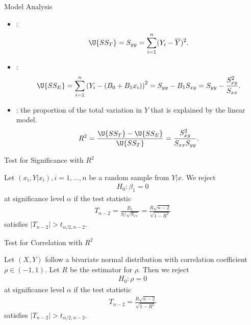 \begin{frame}{Model Analysis}

\begin{itemize}
	\justifying
	\item {}:
	\begin{align*}
	\U{SS_T} = S_{yy} = \sum_{i=1}^n (Y_i-\overline{Y})^2.
	\end{align*}
	\item {}:
	\begin{align*}
	\U{SS_E} = \sum_{i=1}^n \left(Y_i-(B_0+B_1x_i)\right)^2 = S_{yy} - B_1 S_{xy} = S_{yy} - \frac{S_{xy}^2}{S_{xx}}.
	\end{align*}
	\item {}: the proportion of the total variation in $Y$ that is explained by the linear model.
	\begin{align*}
	R^2 = \frac{\U{SS_T} - \U{SS_E}}{\U{SS_T}} = \frac{S_{xy}^2}{S_{xx}S_{yy}}.
	\end{align*}
\end{itemize}

\end{frame}


\begin{frame}{Test for Significance with $R^2$}

\justifying
{} Let $(x_i, Y|x_i), i = 1, \ldots, n$ be a random sample from $Y|x$. We reject
\begin{align*}
H_0: \beta_1 = 0
\end{align*}
at significance level $\alpha$ if the test statistic
\begin{align*}
T_{n-2} = \frac{B_1}{S/\sqrt{S_{xx}}} = \frac{R\sqrt{n-2}}{\sqrt{1-R^2}}
\end{align*}
satisfies $|T_{n-2}| > t_{\alpha/2,n-2}$.

\end{frame}


\begin{frame}{Test for Correlation with $R^2$}

\justifying
{} Let $(X, Y)$ follow a bivariate normal distribution with correlation coefficient $\rho\in (-1, 1)$. Let $R$ be the estimator for $\rho$. Then we reject
\begin{align*}
H_0: \rho = 0
\end{align*}
at significance level $\alpha$ if the test statistic
\begin{align*}
T_{n-2} = \frac{R\sqrt{n-2}}{\sqrt{1-R^2}}
\end{align*}
satisfies $|T_{n-2}| > t_{\alpha/2,n-2}$.

\end{frame}



